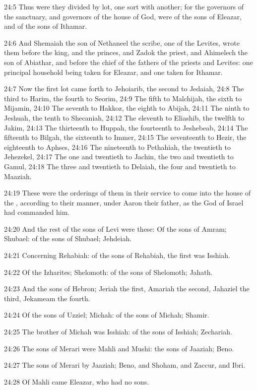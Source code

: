 24:5 Thus were they divided by lot, one sort with another; for the governors of the sanctuary, and governors of the house of God, were of the sons of Eleazar, and of the sons of Ithamar.

24:6 And Shemaiah the son of Nethaneel the scribe, one of the Levites, wrote them before the king, and the princes, and Zadok the priest, and Ahimelech the son of Abiathar, and before the chief of the fathers of the priests and Levites: one principal household being taken for Eleazar, and one taken for Ithamar.

24:7 Now the first lot came forth to Jehoiarib, the second to Jedaiah, 24:8 The third to Harim, the fourth to Seorim, 24:9 The fifth to Malchijah, the sixth to Mijamin, 24:10 The seventh to Hakkoz, the eighth to Abijah, 24:11 The ninth to Jeshuah, the tenth to Shecaniah, 24:12 The eleventh to Eliashib, the twelfth to Jakim, 24:13 The thirteenth to Huppah, the fourteenth to Jeshebeab, 24:14 The fifteenth to Bilgah, the sixteenth to Immer, 24:15 The seventeenth to Hezir, the eighteenth to Aphses, 24:16 The nineteenth to Pethahiah, the twentieth to Jehezekel, 24:17 The one and twentieth to Jachin, the two and twentieth to Gamul, 24:18 The three and twentieth to Delaiah, the four and twentieth to Maaziah.

24:19 These were the orderings of them in their service to come into the house of the \LORD, according to their manner, under Aaron their father, as the \LORD God of Israel had commanded him.

24:20 And the rest of the sons of Levi were these: Of the sons of Amram; Shubael: of the sons of Shubael; Jehdeiah.

24:21 Concerning Rehabiah: of the sons of Rehabiah, the first was Isshiah.

24:22 Of the Izharites; Shelomoth: of the sons of Shelomoth; Jahath.

24:23 And the sons of Hebron; Jeriah the first, Amariah the second, Jahaziel the third, Jekameam the fourth.

24:24 Of the sons of Uzziel; Michah: of the sons of Michah; Shamir.

24:25 The brother of Michah was Isshiah: of the sons of Isshiah; Zechariah.

24:26 The sons of Merari were Mahli and Mushi: the sons of Jaaziah; Beno.

24:27 The sons of Merari by Jaaziah; Beno, and Shoham, and Zaccur, and Ibri.

24:28 Of Mahli came Eleazar, who had no sons.

